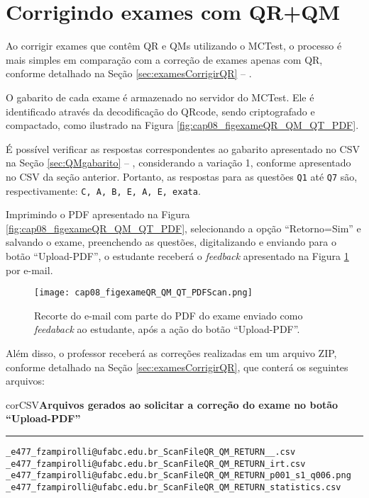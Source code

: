 \section{Corrigindo exames com QR+QM}


Ao corrigir exames que contêm QR e QMs utilizando o MCTest, o processo é mais simples em comparação com a correção de exames apenas com QR, conforme detalhado na Seção \ref{sec:examesCorrigirQR} -- .

O gabarito de cada exame é armazenado no servidor do MCTest. Ele é identificado através da decodificação do QRcode, sendo criptografado e compactado, como ilustrado na Figura \ref{fig:cap08_figexameQR_QM_QT_PDF}.

É possível verificar as respostas correspondentes ao gabarito apresentado no CSV na Seção \ref{sec:QMgabarito} -- , considerando a variação 1, conforme apresentado no CSV da seção anterior. Portanto, as respostas para as questões \verb|Q1| até \verb|Q7| são, respectivamente: \verb|C, A, B, E, A, E, exata|.

Imprimindo o PDF apresentado na Figura \ref{fig:cap08_figexameQR_QM_QT_PDF}, selecionando a opção ``Retorno=Sim'' e salvando o exame, preenchendo as questões, digitalizando e enviando para o botão ``Upload-PDF'',  o estudante receberá o \textit{feedback} apresentado na Figura \ref{fig:cap08_figexameQR_QM_QT_PDFScan} por e-mail.


\begin{figure}[!ht]
  \centering
  \texttt{[image: cap08\_figexameQR\_QM\_QT\_PDFScan.png]}
   \caption{Recorte do e-mail com parte do PDF do exame enviado como \textit{feedaback} ao estudante, após a ação do botão ``Upload-PDF''.}
\label{fig:cap08_figexameQR_QM_QT_PDFScan}
\end{figure}

Além disso, o professor receberá as correções realizadas em um arquivo ZIP, conforme detalhado na Seção \ref{sec:examesCorrigirQR}, que conterá os seguintes arquivos:
 
\begin{myboxCode}{corCSV}{\textbf{Arquivos gerados ao solicitar a correção do exame no botão ``Upload-PDF''}}\vspace{3mm}
\hrule
\begin{verbatim}
_e477_fzampirolli@ufabc.edu.br_ScanFileQR_QM_RETURN__.csv
_e477_fzampirolli@ufabc.edu.br_ScanFileQR_QM_RETURN_irt.csv
_e477_fzampirolli@ufabc.edu.br_ScanFileQR_QM_RETURN_p001_s1_q006.png
_e477_fzampirolli@ufabc.edu.br_ScanFileQR_QM_RETURN_statistics.csv
\end{verbatim}
\end{myboxCode}

